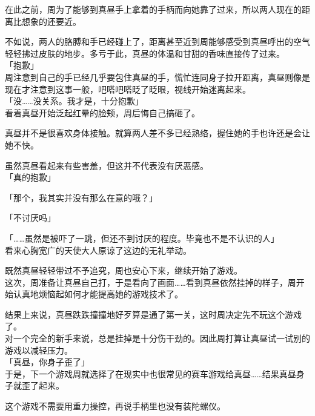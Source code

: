 在此之前，周为了能够到真昼手上拿着的手柄而向她靠了过来，所以两人现在的距离比想象的还要近。

不如说，两人的胳膊和手已经碰上了，距离甚至近到周能够感受到真昼呼出的空气轻轻拂过皮肤的地步。多亏于此，真昼的体温和甘甜的香味直接传了过来。\\

「抱歉」\\

周注意到自己的手已经几乎要包住真昼的手，慌忙连同身子拉开距离，真昼则像是现在才注意到这事一般，吧嗒吧嗒眨了眨眼，视线开始迷离起来。\\

「没……没关系。我才是，十分抱歉」\\

看着真昼开始泛起红晕的脸颊，周后悔自己搞砸了。

真昼并不是很喜欢身体接触。就算两人差不多已经熟络，握住她的手也许还是会让她不快。

虽然真昼看起来有些害羞，但这并不代表没有厌恶感。\\

「真的抱歉」

「那个，我其实并没有那么在意的哦？」

「不讨厌吗」

「……虽然是被吓了一跳，但还不到讨厌的程度。毕竟也不是不认识的人」\\

看来心胸宽广的天使大人原谅了这边的无礼举动。

既然真昼轻轻带过不予追究，周也安心下来，继续开始了游戏。\\

这次，周准备让真昼自己打，于是看向了画面……看到真昼依然挂掉的样子，周开始认真地烦恼起如何才能提高她的游戏技术了。\\

\vspace{2\baselineskip}

结果上来说，真昼跌跌撞撞地好歹算是通了第一关，这时周决定先不玩这个游戏了。\\

对一个完全的新手来说，总是挂掉是十分伤干劲的。因此周打算让真昼试一试别的游戏以减轻压力。\\

「真昼，你身子歪了」\\

于是，下一个游戏周就选择了在现实中也很常见的赛车游戏给真昼……结果真昼身子就歪了起来。

这个游戏不需要用重力操控，再说手柄里也没有装陀螺仪。\\

